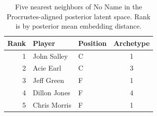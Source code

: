 \begin{table}[htbp]
  \centering\small
  \begin{tabular}{rllc}
    \toprule
    Rank & Player & Position & Archetype \\
    \midrule
    1 & John Salley & C & 1 \\
    2 & Acie Earl & C & 3 \\
    3 & Jeff Green & F & 1 \\
    4 & Dillon Jones & F & 4 \\
    5 & Chris Morris & F & 1 \\
    \bottomrule
  \end{tabular}
  \caption{Five nearest neighbors of No Name in the Procrustes-aligned posterior latent space. Rank is by posterior mean embedding distance.}
  \label{tab:No_Name_neighbors}
\end{table}

